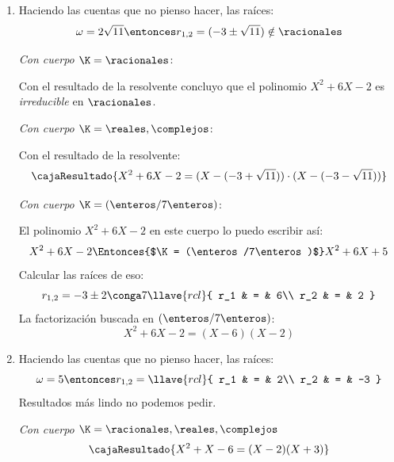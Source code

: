 \begin{enumerate}[label=\roman*)]
  \item
        Haciendo las cuentas que no pienso hacer, las raíces:
        $$
          \omega = 2 \sqrt{11} \entonces r_{1,2} = (-3 \pm \sqrt{11}) \notin \racionales
        $$

        \textit{Con cuerpo $\K = \racionales$}:

        Con el resultado de la resolvente concluyo que el polinomio $X^2 + 6X - 2$ es \textit{irreducible} en $\racionales$.

        \bigskip

        \textit{Con cuerpo $\K = \reales, \complejos$}:

        Con el resultado de la resolvente:
        $$
          \cajaResultado{
            X^2 + 6X - 2 = (X - (-3 + \sqrt{11}) ) \cdot (X - (-3 - \sqrt{11}) )
          }
        $$

        \bigskip

        \textit{Con cuerpo $\K = (\enteros/7\enteros)$}:

        El polinomio $X^2 + 6X - 2$ en este cuerpo lo puedo escribir así:
        $$
          X^2 + 6X - 2  \Entonces{$\K = (\enteros/7\enteros)$} X^2 + 6X + 5
        $$
        Calcular las raíces de eso:
        $$
          r_{1,2} = -3 \pm 2 \conga7
          \llave{rcl}{
            r_1 & = & 6\\
            r_2 & = & 2
          }
        $$
        La factorización buscada en $(\enteros/7\enteros)$:
        $$
          X^2 + 6X - 2 = (X - 6) (X - 2)
        $$

  \item
        Haciendo las cuentas que no pienso hacer, las raíces:
        $$
          \omega = 5 \entonces r_{1,2} =
          \llave{rcl}{
            r_1 & = & 2\\
            r_2 & = & -3
          }
        $$
        Resultados más lindo no podemos pedir.

        \textit{Con cuerpo $\K = \racionales, \reales, \complejos$}
        $$
          \cajaResultado{
            X^2 + X - 6 = (X -2) (X + 3)
          }
        $$


\end{enumerate}
